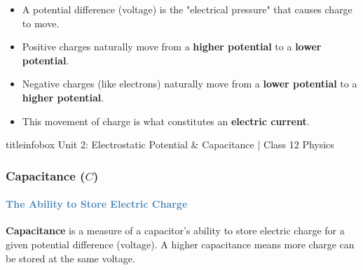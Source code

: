 \begin{frame}
\begin{frame}
\vspace{0.35cm}

\begin{importantbox}
\vspace{0.1cm}
\begin{itemize}
    \item A potential difference (voltage) is the "electrical pressure" that causes charge to move.
    \item Positive charges naturally move from a \textbf{higher potential} to a \textbf{lower potential}.
    \item Negative charges (like electrons) naturally move from a \textbf{lower potential} to a \textbf{higher potential}.
    \item This movement of charge is what constitutes an \textbf{electric current}.
\end{itemize}
\vspace{0.1cm}
\end{importantbox}

\vfill

\begin{beamercolorbox}[wd=\textwidth,ht=0.5cm,dp=0.1cm,center]{titleinfobox}
    \small\color{coolgray} Unit 2: Electrostatic Potential & Capacitance | Class 12 Physics
\end{beamercolorbox}
\end{frame}

\begin{frame}
\frametitle{\textsf{\textbf{Capacitance ($C$)}}}
\framesubtitle{\textcolor{steelblue}{The Ability to Store Electric Charge}}

\vspace{-0.05cm}

\begin{keybox}
\vspace{0.1cm}
\textbf{Capacitance} is a measure of a capacitor's ability to store electric charge for a given potential difference (voltage). A higher capacitance means more charge can be stored at the same voltage.
\vspace{0.1cm}
\end{keybox}


\end{frame}
\end{frame}
